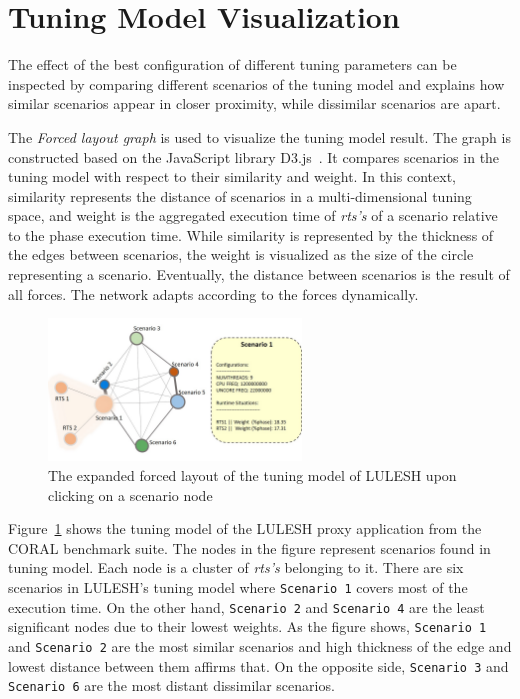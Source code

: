 \section{Tuning Model Visualization} \label{sec:tm-visualization}
The effect of the best configuration of different tuning parameters can be inspected by comparing different scenarios of the tuning model and explains how similar scenarios appear in closer proximity, while dissimilar scenarios are apart.

The \textit{Forced layout graph} is used to visualize the tuning model result. The graph is constructed based on the JavaScript library D3.js~\cite{bostock2011d3}. It compares scenarios in the tuning model with respect to their similarity and weight. In this context, similarity represents the distance of scenarios in a multi-dimensional tuning space, and weight is the aggregated execution time of \textit{rts's} of a scenario relative to the phase execution time. While similarity is represented by the thickness of the edges between scenarios, the weight is visualized as the size of the circle representing a scenario. Eventually, the distance between scenarios is the result of all forces. The network adapts according to the forces dynamically. 

\begin{figure}
	\begin{mdframed}
	\centering
		\includegraphics[width=0.60\textwidth]{figures/luleshTM_expand.jpg}
	\end{mdframed}
	\caption{\label{fig:forced-layout-expand}The expanded forced layout of the tuning model of LULESH upon clicking on a scenario node }
\end{figure}

Figure~\ref{fig:forced-layout-expand} shows the tuning model of the LULESH proxy application from the CORAL benchmark suite. The nodes in the figure represent scenarios found in tuning model. Each node is a cluster of \textit{rts's} belonging to it. There are six scenarios in LULESH's tuning model where \texttt{Scenario~1} covers most of the execution time. On the other hand, \texttt{Scenario~2} and \texttt{Scenario~4} are the least significant nodes due to their lowest weights. As the figure shows, \texttt{Scenario~1} and \texttt{Scenario~2} are the most similar scenarios and high thickness of the edge and lowest distance between them affirms that. On the opposite side, \texttt{Scenario~3} and \texttt{Scenario~6} are the most distant dissimilar scenarios.

